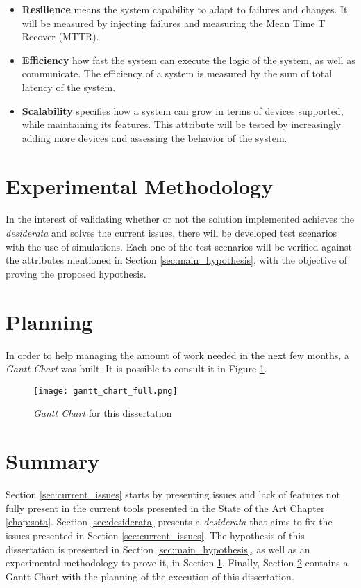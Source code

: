 \begin{itemize}
    \item \textbf{Resilience} means the system capability to adapt to failures and changes. It will be measured by injecting failures and measuring the Mean Time T Recover (MTTR).
    \item \textbf{Efficiency} how fast the system can execute the logic of the system, as well as communicate. The efficiency of a system is measured by the sum of total latency of the system. 
    \item \textbf{Scalability} specifies how a system can grow in terms of devices supported, while maintaining its features. This attribute will be tested by increasingly adding more devices and assessing the behavior of the system.
\end{itemize}

\section{Experimental Methodology}\label{sec:exp_meth}

In the interest of validating whether or not the solution implemented achieves the \emph{desiderata} and solves the current issues, there will be developed test scenarios with the use of simulations. Each one of the test scenarios will be verified against the attributes mentioned in Section \ref{sec:main_hypothesis}, with the objective of proving the proposed hypothesis.


\section{Planning}\label{sec:planning}

In order to help managing the amount of work needed in the next few months, a \textit{Gantt Chart} was built. It is possible to consult it in Figure \ref{fig:gantt}. 
\begin{figure}[h]
    \caption{\textit{Gantt Chart} for this dissertation}
    \label{fig:gantt}
    \centering
    \texttt{[image: gantt\_chart\_full.png]}
    \end{figure}

\section{Summary}\label{sec:stat_summary}

Section \ref{sec:current_issues} starts by presenting issues and lack of features not fully present in the current tools presented in the State of the Art Chapter \ref{chap:sota}. Section \ref{sec:desiderata} presents a \textit{desiderata} that aims to fix the issues presented in Section \ref{sec:current_issues}. The hypothesis of this dissertation is presented in Section \ref{sec:main_hypothesis}, as well as an experimental methodology to prove it, in Section \ref{sec:exp_meth}. Finally, Section \ref{sec:planning} contains a Gantt Chart with the planning of the execution of this dissertation.
